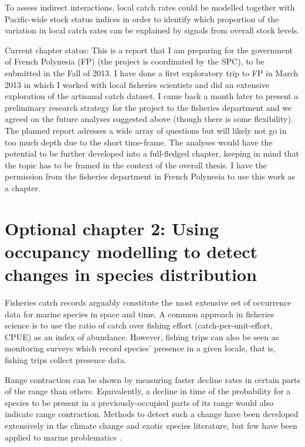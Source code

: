 \documentclass{article}
\begin{document}
To assess indirect interactions, local catch rates could be modelled together
with Pacific-wide stock status indices in order to identify which
proportion of the variation in local catch rates can be explained by
signals from overall stock levels.

Current chapter status: This is a report that I am preparing for the government of
French Polynesia (FP) (the project is coordinated by the SPC), to be
submitted in the Fall of 2013. I have done a first exploratory trip to
FP in March 2013 in which I worked with local fisheries scientists and
did an extensive exploration of the artisanal catch dataset. I came
back a month later to present a preliminary research strategy for the
project to the fisheries department and we agreed on the future
analyses suggested above (though there is some flexibility). The
planned report adresses a wide array of questions but will
likely not go in too much depth due to the short time-frame. The
analyses would have the potential to be further developed into a
full-fledged chapter, keeping in mind that the topic has to be framed
in the context of the overall thesis. I have the permission from the
fisheries department in French Polynesia to use this work as a
chapter.


\newpage
\section*{Optional chapter 2: Using occupancy modelling to detect changes in
  species distribution}

Fisheries catch records arguably constitute the most extensive set of
occurrence data for marine species in space and time. A common
approach in fisheries science is to use the ratio of catch over
fishing effort (catch-per-unit-effort, CPUE) as an index of abundance.
However, fishing trips can also be seen as monitoring surveys which
record species' presence in a given locale, that is, fishing
trips collect presence data.


Range contraction can be shown by measuring faster decline rates in
certain parts of the range than others. Equivalently, a decline in
time of the probability for a species to be present in a
previously-occupied parts of its range would also indicate range
contraction. Methods to detect such a change have been developed
extensively in the climate change and exotic species literature, but
few have been applied to marine problematics \citep{Robinson2011_a}.
\end{document}
